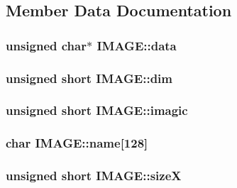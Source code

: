 \subsection{Member Data Documentation}
\hypertarget{structIMAGE_ad2ba44cab5d6a790794d0c37a120453d}{}
\subsubsection[{data}]{\setlength{\rightskip}{0pt plus 5cm}unsigned char$\ast$ I\+M\+A\+G\+E\+::data}\label{structIMAGE_ad2ba44cab5d6a790794d0c37a120453d}
\hypertarget{structIMAGE_a18e7e4c0817b235d0cce9d111805e68c}{}
\subsubsection[{dim}]{\setlength{\rightskip}{0pt plus 5cm}unsigned short I\+M\+A\+G\+E\+::dim}\label{structIMAGE_a18e7e4c0817b235d0cce9d111805e68c}
\hypertarget{structIMAGE_a29320b057d2ba7f683f5c40e030f9212}{}
\subsubsection[{imagic}]{\setlength{\rightskip}{0pt plus 5cm}unsigned short I\+M\+A\+G\+E\+::imagic}\label{structIMAGE_a29320b057d2ba7f683f5c40e030f9212}
\hypertarget{structIMAGE_afc4faf915c6b6cb931fe3631dd29b071}{}
\subsubsection[{name}]{\setlength{\rightskip}{0pt plus 5cm}char I\+M\+A\+G\+E\+::name\mbox{[}128\mbox{]}}\label{structIMAGE_afc4faf915c6b6cb931fe3631dd29b071}
\hypertarget{structIMAGE_a9b60e1afa1748197e621d13d6565da24}{}
\subsubsection[{size\+X}]{\setlength{\rightskip}{0pt plus 5cm}unsigned short I\+M\+A\+G\+E\+::size\+X}\label{structIMAGE_a9b60e1afa1748197e621d13d6565da24}
\hypertarget{structIMAGE_ab61c98eaf9f32603dfcad280aa90d96b}{}
